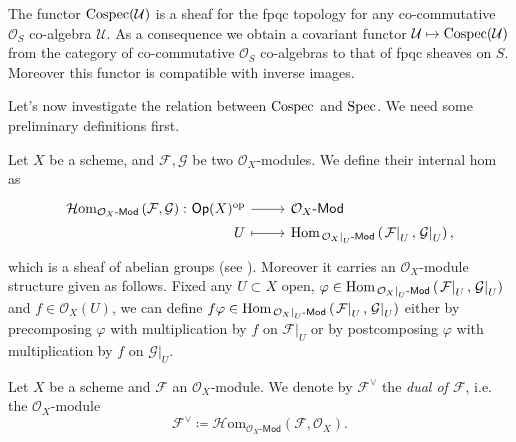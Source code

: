 \begin{rem}
	The functor $\operatorname{Cospec}(\mathcal{U})$ is a sheaf for the fpqc topology
	for any co-commutative $\mathcal{O}_{ S }$ co-algebra $\mathcal{U}$.
	As a consequence we obtain a covariant functor $\mathcal{U} \mapsto \operatorname{Cospec}(\mathcal{U})$
	from the category of co-commutative $\mathcal{O}_{ S }$ co-algebras 
	to that of fpqc sheaves on $S$.
	Moreover this functor is compatible with inverse images.
\end{rem}


\noindent
Let's now investigate the relation between $\operatorname{Cospec}$ and $\operatorname{Spec}$.
We need some preliminary definitions first.
\begin{defn}\label{defn:iHomOXMod}
	Let $X$ be a scheme, and $\mathcal{F}, \mathcal{G}$ be two $\mathcal{O}_{ X }$-modules.
	We define their internal hom as
	\begin{equation*}
	\begin{tikzcd}[row sep = 0ex
		,/tikz/column 1/.append style={anchor=base east}
		,/tikz/column 2/.append style={anchor=base west}]
		\mathcal{H}\mathrm{om}_{ \mathcal{O}_{ X }\text{-}\mathsf{Mod} }
		\left( \mathcal{F}, \mathcal{G} \right)\colon 
		\mathsf{Op}(X)^{\mathrm{op}} \arrow[r, "", rightarrow] &
		\mathcal{O}_{ X }\text{-}\mathsf{Mod} \\
		U \arrow[r, "", mapsto] & 
		\Hom_{ \left.\mathcal{O}_{ X }\right|_{U}\text{-}\mathsf{Mod} } 
			\left( \left.\mathcal{F}\right|_{U}, \left.\mathcal{G}\right|_{U} \right)
	,\end{tikzcd}
	\end{equation*} 
	which is a sheaf of abelian groups (see 
	\cite[\href{https://stacks.math.columbia.edu/tag/00AK}{Section 00AK}]{SP}).
	Moreover it carries an $\mathcal{O}_{ X }$-module structure given as follows.
	Fixed any $U \subset X$ open, 
	$\varphi \in \operatorname{Hom}_{ \left.\mathcal{O}_{ X }\right|_{U}\text{-}\mathsf{Mod}} 
	\left( \left.\mathcal{F}\right|_{U} , \left.\mathcal{G}\right|_{U} \right)$ and
	$f \in \mathcal{O}_{ X }(U)$, we can define $f \varphi \in
	\operatorname{Hom}_{ \left.\mathcal{O}_{ X }\right|_{U}\text{-}\mathsf{Mod}  } 
	\left( \left.\mathcal{F}\right|_{U} , \left.\mathcal{G}\right|_{U} \right)$
	either by precomposing $\varphi$ with multiplication
	by $f$ on $\left.\mathcal{F}\right|_{U}$ or by postcomposing $\varphi$
	with multiplication by $f$ on $\left.\mathcal{G}\right|_{U}$.
\end{defn}


\begin{ntt}
	Let \(X\) be a scheme and \(\mathcal{F}\) an \(\mathcal{O}_{ X }\)-module.
	We denote by \(\mathcal{F}^\vee\) the \emph{dual of \(\mathcal{F}\)},
	i.e. the \(\mathcal{O}_{ X }\)-module
	\begin{equation*}
		\mathcal{F}^\vee \coloneqq
		\mathcal{H}\mathrm{om}_{ \mathcal{O}_{ X }\text{-}\mathsf{Mod}}
		( \mathcal{F}, \mathcal{O}_{ X } )
	.\end{equation*}
\end{ntt}


